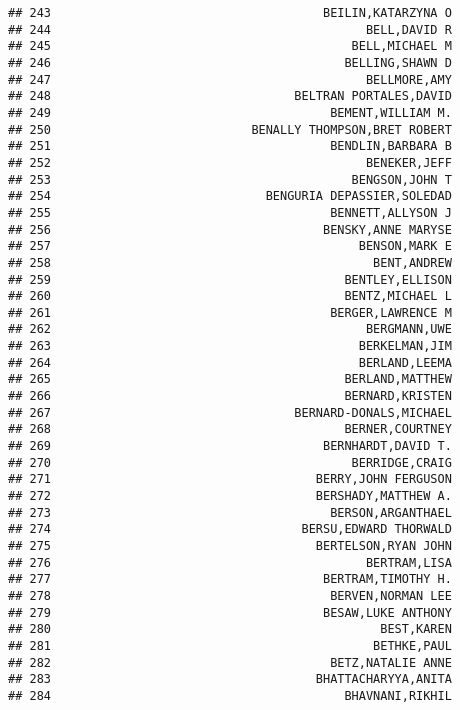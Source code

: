 \documentclass[
]{article}
\begin{document}
\begin{verbatim}
## 243                                      BEILIN,KATARZYNA O
## 244                                            BELL,DAVID R
## 245                                          BELL,MICHAEL M
## 246                                         BELLING,SHAWN D
## 247                                            BELLMORE,AMY
## 248                                  BELTRAN PORTALES,DAVID
## 249                                       BEMENT,WILLIAM M.
## 250                            BENALLY THOMPSON,BRET ROBERT
## 251                                       BENDLIN,BARBARA B
## 252                                            BENEKER,JEFF
## 253                                          BENGSON,JOHN T
## 254                              BENGURIA DEPASSIER,SOLEDAD
## 255                                       BENNETT,ALLYSON J
## 256                                      BENSKY,ANNE MARYSE
## 257                                           BENSON,MARK E
## 258                                             BENT,ANDREW
## 259                                         BENTLEY,ELLISON
## 260                                         BENTZ,MICHAEL L
## 261                                       BERGER,LAWRENCE M
## 262                                            BERGMANN,UWE
## 263                                           BERKELMAN,JIM
## 264                                           BERLAND,LEEMA
## 265                                         BERLAND,MATTHEW
## 266                                         BERNARD,KRISTEN
## 267                                  BERNARD-DONALS,MICHAEL
## 268                                         BERNER,COURTNEY
## 269                                      BERNHARDT,DAVID T.
## 270                                          BERRIDGE,CRAIG
## 271                                     BERRY,JOHN FERGUSON
## 272                                     BERSHADY,MATTHEW A.
## 273                                       BERSON,ARGANTHAEL
## 274                                   BERSU,EDWARD THORWALD
## 275                                     BERTELSON,RYAN JOHN
## 276                                            BERTRAM,LISA
## 277                                      BERTRAM,TIMOTHY H.
## 278                                       BERVEN,NORMAN LEE
## 279                                      BESAW,LUKE ANTHONY
## 280                                              BEST,KAREN
## 281                                             BETHKE,PAUL
## 282                                       BETZ,NATALIE ANNE
## 283                                     BHATTACHARYYA,ANITA
## 284                                         BHAVNANI,RIKHIL

\end{verbatim}
\end{document}
